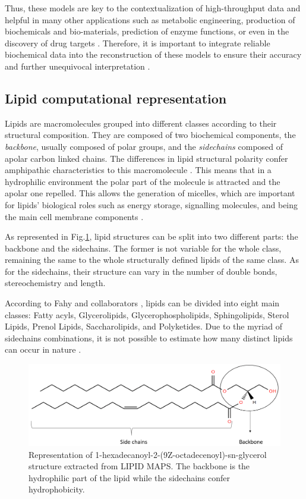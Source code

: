 \documentclass{llncs}
\begin{document}
Thus, these models are key to the contextualization of high-throughput data and helpful in many other applications such as metabolic engineering, production of biochemicals and bio-materials, prediction of enzyme functions, or even in the discovery of drug targets \cite{Gu2019,Kim2017}.
Therefore, it is important to integrate reliable biochemical data into the reconstruction of these models to ensure their accuracy and further unequivocal interpretation \cite{Moseley2021,Passi2021}. 


\subsection{Lipid computational representation}
Lipids are macromolecules grouped into different classes according to their structural composition. 
They are composed of two biochemical components, the \textit{backbone}, usually composed of polar groups, and the \textit{sidechains} composed of apolar carbon linked chains.  
The differences in lipid structural polarity confer amphipathic characteristics to this macromolecule \cite{Fahy2011}. 
This means that in a hydrophilic environment the polar part of the molecule is attracted and the apolar one repelled.
This allows the generation of micelles, which are important for lipids' biological roles such as energy storage, signalling molecules, and being the main cell membrane components \cite{Cullis1986}.

As represented in Fig.\ref{fig1}, lipid structures can be split into two different parts: the backbone and the sidechains. The former is not variable for the whole class, remaining the same to the whole structurally defined lipids of the same class.
As for the sidechains, their structure can vary in the number of double bonds, stereochemistry and length.

According to Fahy and collaborators \cite{Fahy2009}, lipids can be divided into eight main classes: Fatty acyls,  Glycerolipids, Glycerophospholipids, Sphingolipids, Sterol Lipids, Prenol Lipids, Saccharolipids, and Polyketides. 
Due to the myriad of sidechains combinations, it is not possible to estimate how many distinct lipids can occur in nature \cite{Gyamfi2018,Capela}.

\begin{figure}
    \includegraphics[width=\textwidth]{imagens/lipido.png}
    \caption{Representation of 1-hexadecanoyl-2-(9Z-octadecenoyl)-sn-glycerol structure extracted from LIPID MAPS. The backbone is the hydrophilic part of the lipid while the sidechains confer hydrophobicity.} \label{fig1}
\end{figure}
\end{document}
